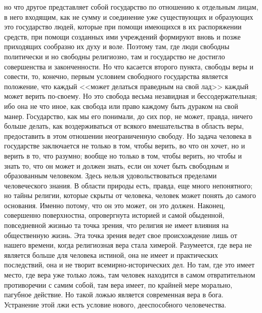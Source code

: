 \documentclass[12pt]{article}
\begin{document}
но что другое представляет собой государство по отношению к отдельным лицам, в него входящим, как не сумму и соединение уже существующих и образующих это государство людей, которые при помощи имеющихся в их распоряжении средств, при помощи созданных ими учреждений формируют вновь и позже приходящих сообразно их духу и воле. Поэтому там, где люди свободны политически и но свободны религиозно, там и государство не достигло совершенства и законченности. Но что касается второго пункта, свободы веры и совести, то, конечно, первым условием свободного государства является положение, что каждый <<может делаться праведным на свой лад>>  каждый может верить по-своему. Но это свобода весьма незавидная и бессодержательная; ибо она не что иное, как свобода или право каждому быть дураком на свой манер. Государство, как мы его понимали, до сих пор, не может, правда, ничего больше делать, как воздерживаться от всякого вмешательства в область веры, предоставить в этом отношении неограниченную свободу. Но задача человека в государстве заключается не только в том, чтобы верить, во что он хочет, но и верить в то, что разумно; вообще но только в том, чтобы верить, но чтобы и знать то, что он может и должен знать, если он хочет быть свободным и образованным человеком. Здесь нельзя удовольствоваться пределами человеческого знания. В области природы есть, правда, еще много непонятного; но тайны религии, которые скрыты от человека, человек может понять до самого основания. Именно потому, что он это может, он это должен. Наконец, совершенно поверхностна, опровергнута историей и самой обыденной, повседневной жизнью та точка зрения, что религия не имеет влияния на общественную жизнь. Эта точка зрения ведет свое происхождение лишь от нашего времени, когда религиозная вера стала химерой. Разумеется, где вера не является больше для человека истиной, она не имеет и практических последствий, она и не творит всемирно-исторических дел. Но там, где это имеет место, где вера уже только ложь, там человек находится в самом отвратительном противоречии с самим собой, там вера имеет, по крайней мере морально, пагубное действие. Но такой ложью является современная вера в бога. Устранение этой лжи есть условие нового, дееспособного человечества. 
\end{document}

